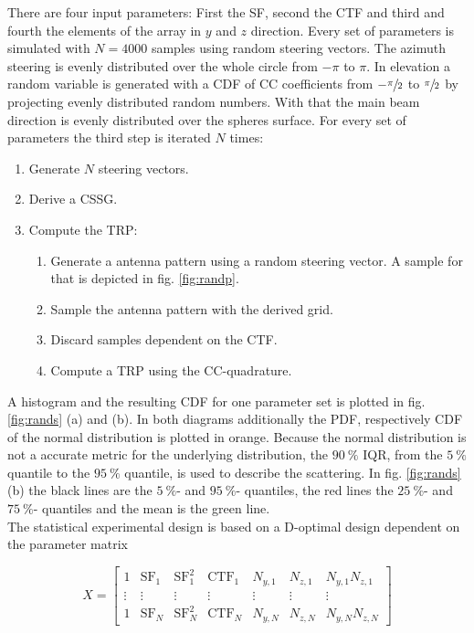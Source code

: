 There are four input parameters: First the \ac{SF}, second the \ac{CTF} and third and fourth the elements of the array in $y$ and $z$ direction. Every set of parameters is simulated with $N=4000$ samples using random steering vectors. The azimuth steering is evenly distributed over the whole circle from $-\pi$ to $\pi$. In elevation a random variable is generated with a \ac{CDF} of \ac{CC} coefficients from $-\sfrac{\pi}{2}$ to $\sfrac{\pi}{2}$ by projecting evenly distributed random numbers. With that the main beam direction is evenly distributed over the spheres surface. For every set of parameters the third step is iterated $N$ times:

\begin{enumerate}
\item Generate $N$ steering vectors.
\item Derive a \ac{CSSG}.
\item Compute the \ac{TRP}:
\begin{enumerate}
\item Generate a antenna pattern using a random steering vector. A sample for that is depicted in fig. \ref{fig:randp}.
\item Sample the antenna pattern with the derived grid.
\item Discard samples dependent on the \ac{CTF}.
\item Compute a \ac{TRP} using the \ac{CC}-quadrature.
\end{enumerate}
\end{enumerate}

A histogram and the resulting \ac{CDF} for one parameter set is plotted in fig. \ref{fig:rands} (a) and (b). In both diagrams additionally the \ac{PDF}, respectively \ac{CDF} of the normal distribution is plotted in orange. Because the normal distribution is not a accurate metric for the underlying distribution, the $\SI{90}{\percent}$ \ac{IQR}, from the $\SI{5}{\percent}$ quantile to the $\SI{95}{\percent}$ quantile, is used to describe the scattering. In fig. \ref{fig:rands} (b) the black lines are the $\SI{5}{\percent}$- and $\SI{95}{\percent}$- quantiles, the red lines the $\SI{25}{\percent}$- and $\SI{75}{\percent}$- quantiles and the mean is the green line.\\
The statistical experimental design is based on a D-optimal design dependent on the parameter matrix

\begin{equation}
X = \begin{bmatrix}
1 & \text{SF}_1 & \text{SF}_1^2 & \text{CTF}_1 & N_{y,1} & N_{z,1} & N_{y,1}N_{z,1}\\
\vdots & \vdots & \vdots & \vdots & \vdots & \vdots & \vdots\\
1 & \text{SF}_N & \text{SF}_N^2 & \text{CTF}_N & N_{y,N} & N_{z,N} & N_{y,N}N_{z,N}
\end{bmatrix}
\label{eq:parammatrix}
\end{equation}

